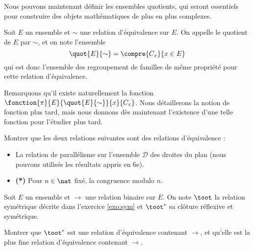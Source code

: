 Nous pouvons maintenant définir les ensembles quotients, qui seront essentiels pour construire des objets mathématiques de plus en plus complexes.

\begin{defi}
    Soit $E$ un ensemble et $\sim$ une relation d'équivalence sur $E$. On appelle le quotient de $E$ par $\sim$, et on note  l'ensemble $$\quot{E}{\sim} = \compre{C_x}{x\in E}$$ qui est donc l'ensemble des regroupement de familles de même propriété pour cette relation d'équivalence.
    
    Remarquons qu'il existe naturellement la fonction $\fonction{\pi}{E}{\quot{E}{\sim}}{x}{C_x}$. Nous détaillerons la notion de fonction plus tard, mais nous donnons dès maintenant l'existence d'une telle fonction pour l'étudier plus tard.
\end{defi}

\begin{exo}
    Montrer que les deux relations suivantes sont des relations d'équivalence :
    \begin{itemize}[label=$\bullet$]
        \item La relation de parallélisme sur l'ensemble $\mathcal D$ des droites du plan (nous pouvons utilisés les résultats appris en 6e).
        \item \textbf{(*)} Pour $n\in\nat$ fixé, la congruence modulo $n$.
    \end{itemize}
\end{exo}

\begin{exo}
    Soit $E$ un ensemble et $\to$ une relation binaire sur $E$. On note $\toot$ la relation symétrique décrite dans l'exercice \ref{exo:sym} et $\toot^*$ sa clôture réflexive et symétrique.
    
    Montrer que $\toot^*$ est une relation d'équivalence contenant $\to$, et qu'elle est la plus fine relation d'équivalence contenant $\to$.
\end{exo}

